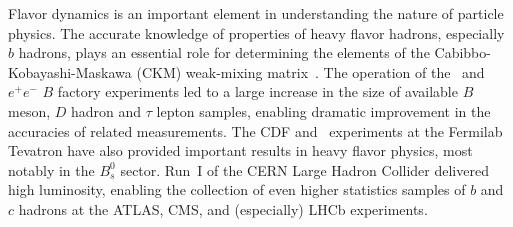 %

\label{sec:intro}

Flavor dynamics is an important element in understanding the nature of
particle physics.  The accurate knowledge of properties of heavy flavor
hadrons, especially $b$ hadrons, plays an essential role for
determining the elements of the Cabibbo-Kobayashi-Maskawa (CKM)
weak-mixing matrix~\cite{Cabibbo:1963yz,Kobayashi:1973fv}. 
The operation of the \belle\ and \babar\ $e^+e^-$ $B$ factory 
experiments led to a large increase in the size of available 
$B$ meson, $D$ hadron and $\tau$ lepton samples, 
enabling dramatic improvement in the accuracies of related measurements.
The CDF and \dzero\ experiments at the Fermilab Tevatron 
have also provided important results in heavy flavor physics,
most notably in the $B^0_s$ sector.
Run~I of the CERN Large Hadron Collider delivered high luminosity, 
enabling the collection of even higher statistics samples of $b$ 
and $c$ hadrons at the ATLAS, CMS, and (especially) LHCb experiments.
 
